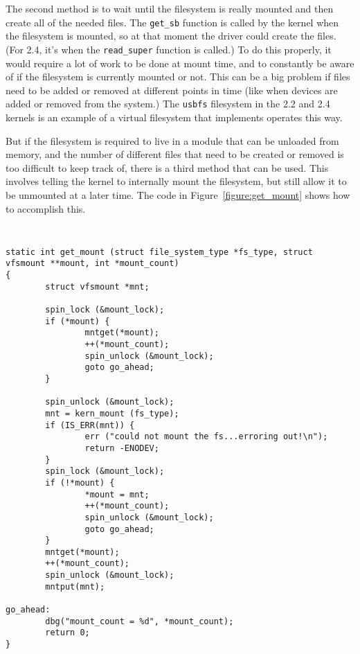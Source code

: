 \documentclass[twocolumn]{article}
\begin{document}
The second method is to wait until the filesystem is really mounted and
then create all of the needed files.  The {\tt get\_sb} function is called
by the kernel when the filesystem is mounted, so at that moment the driver
could create the files.  (For 2.4, it's when the {\tt read\_super} function
is called.) To do this properly, it would require a lot of work to be done
at mount time, and to constantly be aware of if the filesystem is currently
mounted or not.  This can be a big problem if files need to be added or
removed at different points in time (like when devices are added or removed
from the system.) The {\tt usbfs} filesystem in the 2.2 and 2.4 kernels is
an example of a virtual filesystem that implements operates this way.

But if the filesystem is required to live in a module that can be unloaded
from memory, and the number of different files that need to be created or
removed is too difficult to keep track of, there is a third method that can
be used.  This involves telling the kernel to internally mount the
filesystem, but still allow it to be unmounted at a later time.
The code in Figure~\ref{figure:get_mount} shows how to accomplish this.
\begin{figure*}[tb]
{\tt \small
\begin{verbatim}
static int get_mount (struct file_system_type *fs_type, struct vfsmount **mount, int *mount_count)
{
        struct vfsmount *mnt;

        spin_lock (&mount_lock);
        if (*mount) {
                mntget(*mount);
                ++(*mount_count);
                spin_unlock (&mount_lock);
                goto go_ahead;
        }

        spin_unlock (&mount_lock);
        mnt = kern_mount (fs_type);
        if (IS_ERR(mnt)) {
                err ("could not mount the fs...erroring out!\n");
                return -ENODEV;
        }
        spin_lock (&mount_lock);
        if (!*mount) {
                *mount = mnt;
                ++(*mount_count);
                spin_unlock (&mount_lock);
                goto go_ahead;
        }
        mntget(*mount);
        ++(*mount_count);
        spin_unlock (&mount_lock);
        mntput(mnt);

go_ahead:
        dbg("mount_count = %d", *mount_count);
        return 0;
}
\end{verbatim}
}
\caption{\footnotesize{
{\tt get\_mount} from {\tt drivers/usb/core/inode.c}}}
\label{figure:get_mount}
\end{figure*}
\end{document}
